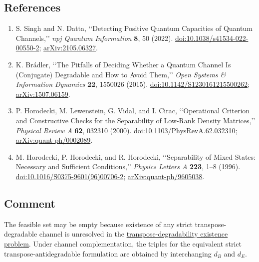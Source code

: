 \subsection*{References}

\begin{enumerate}[label={},leftmargin=4.8em,labelsep=0.5em]
  \footnotesize
  \item[\textup{[SD22]}]\label{ref:p54-singh-datta}
  S. Singh and N. Datta,
  \lq\lq Detecting Positive Quantum Capacities of Quantum Channels,\rq\rq{}
  \emph{npj Quantum Information} \textbf{8}, 50 (2022).
  \href{https://doi.org/10.1038/s41534-022-00550-2}{doi:10.1038/s41534-022-00550-2};
  \href{https://arxiv.org/abs/2105.06327}{arXiv:2105.06327}.

  \item[\textup{[Bra15]}]\label{ref:p54-bradler}
  K. Br{\'a}dler,
  \lq\lq The Pitfalls of Deciding Whether a Quantum Channel Is (Conjugate)
  Degradable and How to Avoid Them,\rq\rq{}
  \emph{Open Systems \& Information Dynamics} \textbf{22}, 1550026 (2015).
  \href{https://doi.org/10.1142/S1230161215500262}{doi:10.1142/S1230161215500262};
  \href{https://arxiv.org/abs/1507.06159}{arXiv:1507.06159}.

  \item[\textup{[HLVC00]}]\label{ref:p54-horodecki-low-rank}
  P. Horodecki, M. Lewenstein, G. Vidal, and I. Cirac,
  \lq\lq Operational Criterion and Constructive Checks for the Separability of
  Low-Rank Density Matrices,\rq\rq{} \emph{Physical Review A} \textbf{62},
  032310 (2000).
  \href{https://doi.org/10.1103/PhysRevA.62.032310}{doi:10.1103/PhysRevA.62.032310};
  \href{https://arxiv.org/abs/quant-ph/0002089}{arXiv:quant-ph/0002089}.

  \item[\textup{[HHH96]}]\label{ref:p54-horodecki-ppt}
  M. Horodecki, P. Horodecki, and R. Horodecki,
  \lq\lq Separability of Mixed States: Necessary and Sufficient
  Conditions,\rq\rq{} \emph{Physics Letters A} \textbf{223}, 1--8 (1996).
  \href{https://doi.org/10.1016/S0375-9601(96)00706-2}{doi:10.1016/S0375-9601(96)00706-2};
  \href{https://arxiv.org/abs/quant-ph/9605038}{arXiv:quant-ph/9605038}.
\end{enumerate}

\subsection*{Comment}

The feasible set may be empty because existence of any strict
transpose-degradable channel is unresolved in the
\href{https://qiqc-op.com/problem/op_7e7e4a25fef5c994/}{transpose-degradability existence problem}.  Under channel
complementation, the triples for the equivalent strict
transpose-antidegradable formulation are obtained by interchanging $d_B$ and
$d_E$.

